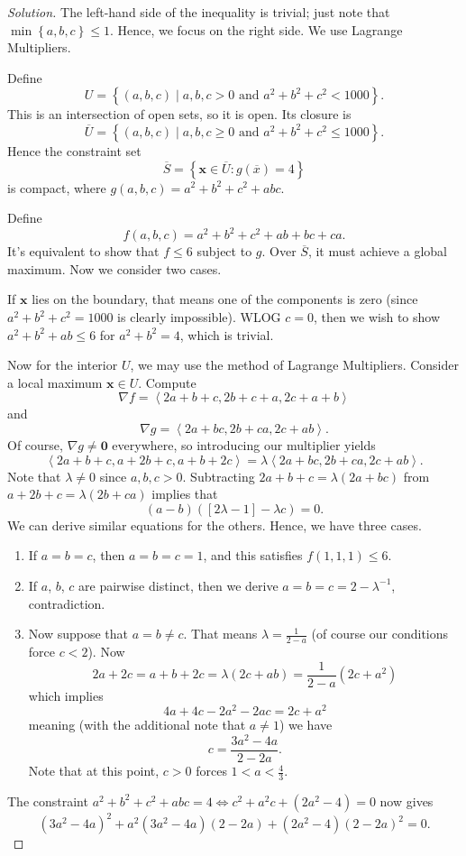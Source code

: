 \documentclass[11pt]{scrartcl}
\begin{document}
\begin{proof}[Solution]
The left-hand side of the inequality is trivial;
just note that $\min \left\{ a,b,c \right\} \le 1$.
Hence, we focus on the right side.
We use Lagrange Multipliers.

Define \[ U = \left\{ (a,b,c) \mid a,b,c > 0
  \text{ and } a^2+b^2+c^2 < 1000 \right\}. \]
This is an intersection of open sets, so it is open.
Its closure is
\[ \overline U = \left\{ (a,b,c) \mid a,b,c \ge 0
\text{ and } a^2+b^2+c^2 \le 1000 \right\}. \]
Hence the constraint set
\[ \overline S = \left\{ \mathbf x \in \overline U : g(\overline x) = 4 \right\} \]
is compact, where $g(a,b,c) = a^2+b^2+c^2+abc$.

Define \[ f(a,b,c) = a^2+b^2+c^2+ab+bc+ca. \]
It's equivalent to show that $f \le 6$ subject to $g$.
Over $\overline S$, it must achieve a global maximum.
Now we consider two cases.

If $\mathbf x$ lies on the boundary,
that means one of the components is zero
(since $a^2+b^2+c^2=1000$ is clearly impossible).
WLOG $c=0$, then we wish to show $a^2+b^2+ab \le 6$
for $a^2+b^2=4$, which is trivial.

Now for the interior $U$, we may use the method of Lagrange Multipliers.
Consider a local maximum $\mathbf x \in U$.
Compute \[ \nabla f = \left<2a+b+c, 2b+c+a, 2c+a+b \right> \]
and \[ \nabla g = \left<2a+bc, 2b+ca, 2c+ab\right>. \]
Of course, $\nabla g \neq \mathbf 0$ everywhere,
so introducing our multiplier yields
\[ \left<2a+b+c,a+2b+c,a+b+2c\right> = \lambda \left<2a+bc,2b+ca,2c+ab\right>. \]
Note that $\lambda \neq 0$ since $a,b,c > 0$.
Subtracting $2a+b+c = \lambda(2a+bc)$ from $a+2b+c = \lambda(2b+ca)$
implies that \[ (a-b)(\left[ 2\lambda - 1 \right] - \lambda c) = 0. \]
We can derive similar equations for the others.
Hence, we have three cases.
\begin{enumerate}
  \item If $a=b=c$, then $a=b=c=1$, and this satisfies $f(1,1,1) \le 6$.
  \item If $a$, $b$, $c$ are pairwise distinct,
  then we derive $a = b = c = 2 - \lambda^{-1}$, contradiction.
  \item Now suppose that $a=b \neq c$.
  That means $\lambda = \frac{1}{2-a}$
  (of course our conditions force $c < 2$).
  Now \[ 2a+2c = a+b+2c = \lambda (2c+ab) = \frac{1}{2-a} (2c+a^2) \]
  which implies \[ 4a+4c-2a^2-2ac = 2c+a^2 \] meaning
  (with the additional note that $a \neq 1$) we have \[ c =
  \frac{3a^2-4a}{2-2a}. \]
  Note that at this point, $c > 0$ forces $1 < a < \frac 43$.
\end{enumerate}
The constraint $a^2+b^2+c^2+abc=4 \iff c^2 + a^2c + (2a^2-4) = 0$ now gives
\[ \left( 3a^2-4a \right)^2
  + a^2 \left( 3a^2-4a \right)\left( 2-2a \right)
  + \left( 2a^2-4 \right)\left( 2-2a \right)^2 = 0. \]


\end{proof}
\end{document}
